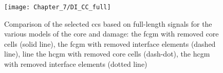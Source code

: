\begin{figure}[!bh]
	\begin{center}
		\texttt{[image: Chapter\_7/DI\_CC\_full]}
	\end{center}
	\caption{Comparison of the selected \acfp{cc} based on full-length signals for the various models of the core and damage: the \acf{fcgm} with removed core cells (solid line), the \ac{fcgm} with removed interface elements (dashed line), line the \acf{hcgm} with removed core cells (dash-dot), the \ac{hcgm} with removed interface elements (dotted line)}
	\label{fig:DI_CC}
\end{figure}